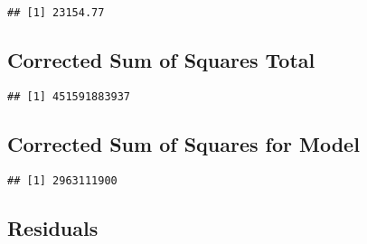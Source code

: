 \documentclass[
]{article}
\newenvironment{Shaded}{\begin{snugshade}}{\end{snugshade}}
\newcommand{\DecValTok}[1]{\textcolor[rgb]{0.00,0.00,0.81}{#1}}
\newcommand{\FunctionTok}[1]{\textcolor[rgb]{0.00,0.00,0.00}{#1}}
\newcommand{\NormalTok}[1]{#1}
\newcommand{\OtherTok}[1]{\textcolor[rgb]{0.56,0.35,0.01}{#1}}
\newcommand{\SpecialCharTok}[1]{\textcolor[rgb]{0.00,0.00,0.00}{#1}}
\begin{document}
\begin{verbatim}
## [1] 23154.77
\end{verbatim}

\hypertarget{corrected-sum-of-squares-total}{%
\subsection{Corrected Sum of Squares
Total}\label{corrected-sum-of-squares-total}}

\begin{Shaded}
\end{Shaded}

\begin{verbatim}
## [1] 451591883937
\end{verbatim}

\hypertarget{corrected-sum-of-squares-for-model}{%
\subsection{Corrected Sum of Squares for
Model}\label{corrected-sum-of-squares-for-model}}

\begin{Shaded}
\end{Shaded}

\begin{verbatim}
## [1] 2963111900
\end{verbatim}

\hypertarget{residuals}{%
\subsection{Residuals}\label{residuals}}

\begin{Shaded}
\end{Shaded}
\end{document}
